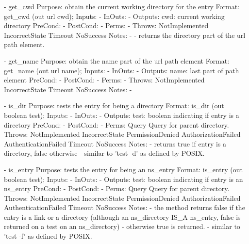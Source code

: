 \begin{myspec}
 
 
    - get_cwd
      Purpose:  obtain the current working directory for the
                entry
      Format:   get_cwd            (out url       cwd);
      Inputs:   -
      InOuts:   -
      Outputs:  cwd:                current working directory
      PreCond:  -
      PostCond: -
      Perms:    -
      Throws:   NotImplemented
                IncorrectState
                Timeout
                NoSuccess
      Notes:    -
                - returns the directory part of the url path
                  element.
 
 
 
    - get_name
      Purpose:  obtain the name part of the url path element
      Format:   get_name           (out  url       name);
      Inputs:   -
      InOuts:   -
      Outputs:  name:               last part of path element
      PreCond:  -
      PostCond: -
      Perms:    -
      Throws:   NotImplemented
                IncorrectState
                Timeout
                NoSuccess
      Notes:    -
 
 
 
    - is_dir
      Purpose:  tests the entry for being a directory
      Format:   is_dir             (out boolean test);
      Inputs:   -
      InOuts:   -
      Outputs:  test:               boolean indicating if entry
                                    is a directory
      PreCond:  -
      PostCond: -
      Perms:    Query
                Query for parent directory.
      Throws:   NotImplemented
                IncorrectState
                PermissionDenied
                AuthorizationFailed
                AuthenticationFailed
                Timeout
                NoSuccess
      Notes:    - returns true if entry is a directory, false
                  otherwise
                - similar to 'test -d' as defined by POSIX.
 
 
    - is_entry
      Purpose:  tests the entry for being an ns_entry
      Format:   is_entry           (out boolean test);
      Inputs:   -
      InOuts:   -
      Outputs:  test:               boolean indicating if entry
                                    is an ns_entry
      PreCond:  -
      PostCond: -
      Perms:    Query
                Query for parent directory.
      Throws:   NotImplemented
                IncorrectState
                PermissionDenied
                AuthorizationFailed
                AuthenticationFailed
                Timeout
                NoSuccess
      Notes:    - the method returns false if the entry is a
                  link or a directory (although an ns_directory
                  IS_A ns_entry, false is returned on a test on 
                  an ns_directory) - otherwise true is returned.
                - similar to 'test -f' as defined by POSIX.
 

\end{myspec}
